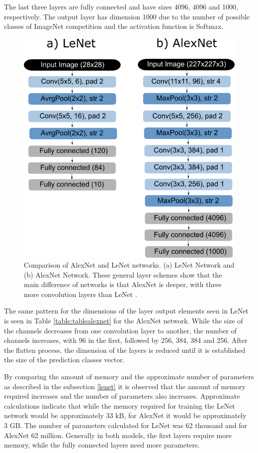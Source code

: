 The last three layers are fully connected and have sizes 4096, 4096 and 1000, respectively. The output layer has dimension 1000 due to the number of possible classes of ImageNet competition and the activation function is Softmax.

\begin{figure}
    \centering
    \includegraphics[scale=0.4]{images/figure129.png}
    \caption{ Comparison of AlexNet and LeNet networks. (a) LeNet Network and (b)  AlexNet Network. These general layer schemes show that the main difference of networks is that AlexNet is deeper, with three more convolution layers than LeNet \cite{zhang2020dive}.}
    \label{fig:lenetalexnet}
\end{figure}

The same pattern for the dimensions of the layer output elements seen in LeNet is seen in Table \ref{table:tablealexnet} for the AlexNet network. While the size of the channels decreases from one convolution layer to another, the number of channels increases, with 96 in the first, followed by 256, 384, 384 and 256. After the flatten process, the dimension of the layers is reduced until it is established the size of the prediction classes vector.

By comparing the amount of memory and the approximate number of parameters as described in the subsection \ref{lenet} it is observed that the amount of memory required increases and the number of parameters also increases. Approximate calculations indicate that while the memory required for training the LeNet network would be approximately $33 \text{ kB}$, for AlexNet it would be approximately $3\text{ GB}$. The number of parameters calculated for LeNet was 62 thousand and for AlexNet 62 million.  Generally in both models, the first layers require more memory, while the fully connected layers need more parameters.

